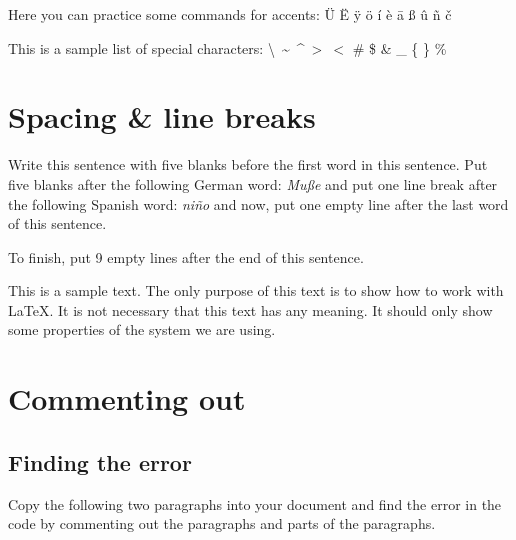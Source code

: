 \documentclass[10pt, paper=a4, abstracton]{scrartcl}
\begin{document}
Here you can practice some commands for accents: \"U \"E \"y \"o \'i \`e \=a \ss{} \^u \~n \v{c} 


\noindent This is a sample list of special characters: \textbackslash\ \textasciitilde\ \textasciicircum\ 
\textgreater\ $<$ \textbar \#  \$  \&  \_  \{  \}  \%


\section{Spacing \& line breaks}

  Write this sentence with five blanks before the first word in this sentence. Put five blanks after the following German word: \textit{Mu{\ss}e}      and put one line break after the following Spanish word: \textit{ni\~no}
  and now, put one empty line after the last word of this sentence.
  
  To finish, put 9 empty lines after the end of this sentence.
  
  
  
  
  
  
  
  
  This is a sample text. The only purpose of this text is to show how to work with \LaTeX . It is not necessary that this text has any meaning. It should only show some properties of the system we are using.


\section{Commenting out}


\subsection{Finding the error}

Copy the following two paragraphs into your document and find the error in the code by commenting out the paragraphs and parts of the paragraphs.
\end{document}
